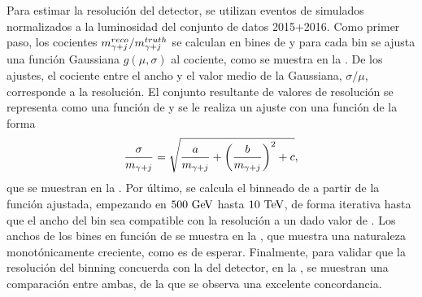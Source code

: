 Para estimar la resolución del detector, se utilizan eventos de \gammajet simulados normalizados a la luminosidad del conjunto de datos 2015+2016. Como primer paso, los cocientes \(m_{\gamma+j}^{reco} / m_{\gamma+j}^{truth}\) se calculan en bines de \myj y para cada bin se ajusta una función Gaussiana \(g(\mu, \sigma)\) al cociente, como se muestra en la \Fig{\ref{fig:results:obs:ratio_fits}}. De los ajustes, el cociente entre el ancho y el valor medio de la Gaussiana, \(\sigma / \mu\), corresponde a la resolución. El conjunto resultante de valores de resolución se representa como una función de \myj y se le realiza un ajuste con una función de la forma
\begin{equation}
    \label{eq:results:obs:binning_resolution}
    \frac{\sigma}{m_{\gamma+j}} = \sqrt{
        \frac{a}{m_{\gamma+j}} +
        \left(\frac{b}{m_{\gamma+j}}\right)^2 +
        c
    },
\end{equation}
que se muestran en la \Fig{\ref{fig:results:obs:resolution_curve}}. Por último, se calcula el binneado de \myj a partir de la función ajustada, empezando en \(500~\text{GeV}\) hasta \(10~\text{TeV}\), de forma iterativa hasta que el ancho del bin sea compatible con la resolución a un dado valor de \myj. Los anchos de los bines en función de \myj se muestra en la \Fig{\ref{fig:bkg_modeling:observable:results:binwidth}}, que muestra una naturaleza monotónicamente creciente, como es de esperar. Finalmente, para validar que la resolución del binning concuerda con la del detector, en la \Fig{\ref{fig:bkg_modeling:observable:results:resolution_comparison}}, se muestran una comparación entre ambas, de la que se observa una excelente concordancia.

